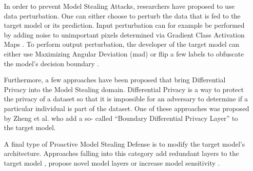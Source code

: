 In order to prevent Model Stealing Attacks, researchers have proposed to use data perturbation. One can either choose to perturb the data that is fed to the target model or its prediction.
Input perturbation can for example be performed by adding noise to unimportant pixels determined via Gradient Class Activation Maps \cite{guiga2020neural}. To perform output perturbation,
the developer of the target model can either use Maximizing Angular Deviation (\gls{mad}) \cite{orekondy2019prediction} or flip a few labels to obfuscate the model's decision boundary
\cite{shi2017evasion}. \par
Furthermore, a few approaches have been proposed that bring Differential Privacy into the Model Stealing domain. Differential Privacy is a way to protect the privacy of a dataset so that 
it is impossible for an adversary to determine if a particular individual is part of the dataset. One of these approaches was proposed by Zheng et al. \cite{zheng2019bdpl} who add a so-
called \enquote{Boundary Differential Privacy Layer} to the target model. \par
A final type of Proactive Model Stealing Defense is to modify the target model's architecture. Approaches falling into this category add redundant layers to the target model 
\cite{chabanne2020protection}, propose novel model layers \cite{xu2018deepobfuscation} or increase model sensitivity \cite{szentannai2020preventing}.
